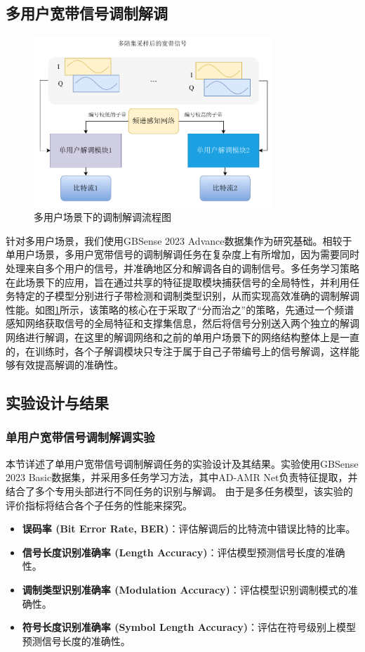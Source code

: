 \subsection{多用户宽带信号调制解调}
\begin{figure}
    \centering
    \includegraphics[width=0.8\textwidth]{Image/adamr-wideband_demodulate_mul.pdf}
    \caption{多用户场景下的调制解调流程图}\label{fig:demode_multiple}
\end{figure}

针对多用户场景，我们使用GBSense 2023 Advance数据集作为研究基础。相较于单用户场景，多用户宽带信号的调制解调任务在复杂度上有所增加，因为需要同时处理来自多个用户的信号，并准确地区分和解调各自的调制信号。多任务学习策略在此场景下的应用，旨在通过共享的特征提取模块捕获信号的全局特性，并利用任务特定的子模型分别进行子带检测和调制类型识别，从而实现高效准确的调制解调性能。如图\ref{fig:demode_multiple}所示，该策略的核心在于采取了“分而治之”的策略，先通过一个频谱感知网络获取信号的全局特征和支撑集信息，然后将信号分别送入两个独立的解调网络进行解调，在这里的解调网络和之前的单用户场景下的网络结构整体上是一直的，在训练时，各个子解调模块只专注于属于自己子带编号上的信号解调，这样能够有效提高解调的准确性。

\subsection{实验设计与结果}

\subsubsection{单用户宽带信号调制解调实验}

本节详述了单用户宽带信号调制解调任务的实验设计及其结果。实验使用GBSense 2023 Basic数据集，并采用多任务学习方法，其中AD-AMR Net负责特征提取，并结合了多个专用头部进行不同任务的识别与解调。
由于是多任务模型，该实验的评价指标将结合各个子任务的性能来探究。
\begin{itemize}
    \item \textbf{误码率 (Bit Error Rate, BER)}：评估解调后的比特流中错误比特的比率。
    \item \textbf{信号长度识别准确率 (Length Accuracy)}：评估模型预测信号长度的准确性。
    \item \textbf{调制类型识别准确率 (Modulation Accuracy)}：评估模型识别调制模式的准确性。
    \item \textbf{符号长度识别准确率 (Symbol Length Accuracy)}：评估在符号级别上模型预测信号长度的准确性。
\end{itemize}

